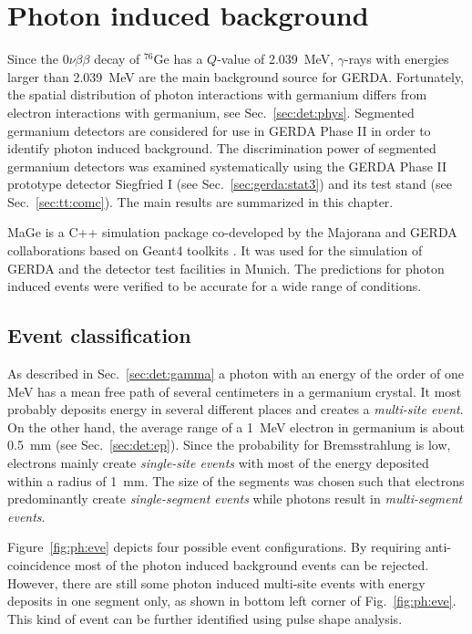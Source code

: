 \chapter{Photon induced background}
\label{cha:photon}
Since the $0\nu\beta\beta$ decay of $^{76}$Ge has a $Q$-value of
2.039~MeV, $\gamma$-rays with energies larger than 2.039~MeV are the
main background source for GERDA. Fortunately, the spatial
distribution of photon interactions with germanium differs from
electron interactions with germanium, see
Sec.~\ref{sec:det:phys}. Segmented germanium detectors are considered
for use in GERDA Phase II in order to identify photon induced
background. The discrimination power of segmented germanium detectors
was examined systematically \cite{Pid07} using the GERDA Phase II
prototype detector Siegfried I (see Sec.~\ref{sec:gerda:stat3}) and
its test stand (see Sec.~\ref{sec:tt:comc}). The main results are
summarized in this chapter.

MaGe \cite{Mag06, Mag08} is a C++ simulation package co-developed by
the Majorana and GERDA collaborations based on Geant4 toolkits
\cite{Gea03, Gea06}. It was used for the simulation of GERDA and the
detector test facilities in Munich. The predictions for photon induced
events were verified to be accurate for a wide range of conditions.

\section{Event classification}
\label{sec:ph:eve}
As described in Sec.~\ref{sec:det:gamma} a photon with an energy of
the order of one MeV has a mean free path of several centimeters in a
germanium crystal. It most probably deposits energy in several
different places and creates a \emph{multi-site event}. On the other
hand, the average range of a 1~MeV electron in germanium is about
0.5~mm (see Sec.~\ref{sec:det:ep}). Since the probability for
Bremsstrahlung is low, electrons mainly create \emph{single-site
events} with most of the energy deposited within a radius of 1~mm. The
size of the segments was chosen such that electrons predominantly
create \emph{single-segment events} while photons result in
\emph{multi-segment events}.

Figure~\ref{fig:ph:eve} depicts four possible event configurations. By
requiring anti-coincidence most of the photon induced background
events can be rejected. However, there are still some photon induced
multi-site events with energy deposits in one segment only, as shown
in bottom left corner of Fig.~\ref{fig:ph:eve}. This kind of event can
be further identified using pulse shape analysis.

